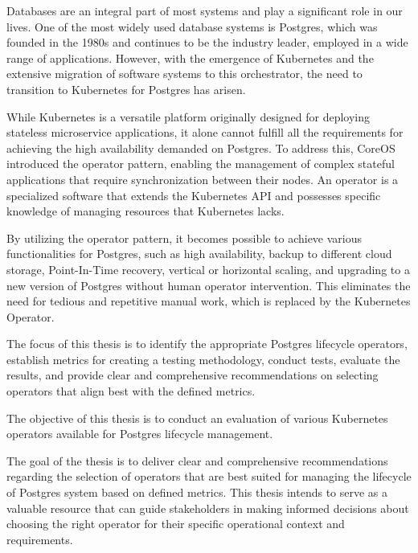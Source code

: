 
Databases are an integral part of most systems and play a significant role in our lives. One of the most widely used database systems is Postgres, which was founded in the 1980s and continues to be the industry leader, employed in a wide range of applications. However, with the emergence of Kubernetes and the extensive migration of software systems to this orchestrator, the need to transition to Kubernetes for Postgres has arisen.

While Kubernetes is a versatile platform originally designed for deploying stateless microservice applications, it alone cannot fulfill all the requirements for achieving the high availability demanded on Postgres. To address this, CoreOS introduced the operator pattern, enabling the management of complex stateful applications that require synchronization between their nodes. An operator is a specialized software that extends the Kubernetes API and possesses specific knowledge of managing resources that Kubernetes lacks.

By utilizing the operator pattern, it becomes possible to achieve various functionalities for Postgres, such as high availability, backup to different cloud storage, Point-In-Time recovery, vertical or horizontal scaling, and upgrading to a new version of Postgres without human operator intervention. This eliminates the need for tedious and repetitive manual work, which is replaced by the Kubernetes Operator.

The focus of this thesis is to identify the appropriate Postgres lifecycle operators, establish metrics for creating a testing methodology, conduct tests, evaluate the results, and provide clear and comprehensive recommendations on selecting operators that align best with the defined metrics.

\label{chap:objectives}
The objective of this thesis is to conduct an evaluation of various Kubernetes operators available for Postgres lifecycle management.

The goal of the thesis is to deliver clear and comprehensive recommendations regarding the selection of operators that are best suited for managing the lifecycle of Postgres system based on defined metrics. This thesis intends to serve as a valuable resource that can guide stakeholders in making informed decisions about choosing the right operator for their specific operational context and requirements.

